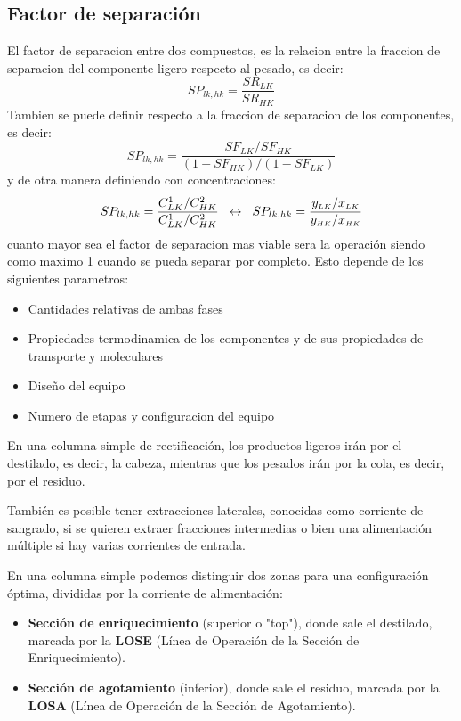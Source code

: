 \documentclass{report}
\begin{document}
\subsection{Factor de separación}
\begin{raggedright}
	El factor de separacion entre dos compuestos, es la relacion entre la fraccion de separacion del componente ligero respecto al pesado, es decir:
	\begin{equation*}
		SP_{lk,hk} = \frac{SR_{LK}}{SR_{HK}}
	\end{equation*}
	Tambien se puede definir respecto a la fraccion de separacion de los componentes, es decir:
	\begin{equation*}
		SP_{lk,hk} = \frac{SF_{LK}/SF_{HK}}{(1-SF_{HK})/(1-SF_{LK})}
	\end{equation*}
	y de otra manera definiendo con concentraciones:
	\begin{equation*}
		SP_{lk,hk} = \frac{C_{LK}^1/C_{HK}^2}{C_{LK}^1/C_{HK}^2}\hspace{0.2cm} \leftrightarrow \hspace{0.2cm} SP_{lk,hk} = \frac{\large y_{\scriptscriptstyle LK}/x_{\scriptscriptstyle LK}} {\large y_{\scriptscriptstyle HK}/x_{\scriptscriptstyle HK}}
	\end{equation*}
cuanto mayor sea el factor de separacion mas viable sera la operación siendo como maximo 1 cuando se pueda separar por completo. Esto depende de los siguientes parametros:
\end{raggedright}
\begin{itemize}
	\item Cantidades relativas de ambas fases
	\item Propiedades termodinamica de los componentes y de sus propiedades de transporte y moleculares
	\item Diseño del equipo
	\item Numero de etapas y configuracion del equipo
\end{itemize}
{En una columna simple de rectificación, los productos ligeros irán por el destilado, es decir, la cabeza, mientras que los pesados irán por la cola, es decir, por el residuo.  

También es posible tener extracciones laterales, conocidas como corriente de sangrado, si se quieren extraer fracciones intermedias o bien una alimentación múltiple si hay varias corrientes de entrada.  

En una columna simple podemos distinguir dos zonas para una configuración óptima, divididas por la corriente de alimentación:  
\begin{itemize}
	\item \textbf{Sección de enriquecimiento} (superior o "top"), donde sale el destilado, marcada por la \textbf{LOSE} (Línea de Operación de la Sección de Enriquecimiento). 
	\item \textbf{Sección de agotamiento} (inferior), donde sale el residuo, marcada por la \textbf{LOSA} (Línea de Operación de la Sección de Agotamiento).
\end{itemize}
}
\end{document}
